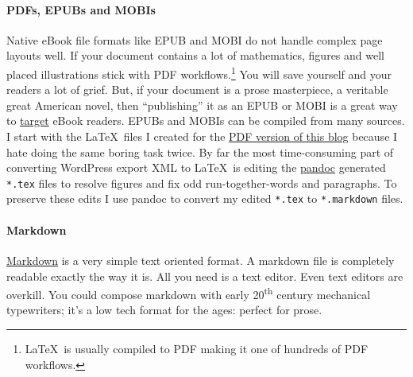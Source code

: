 \paragraph{PDFs, EPUBs and MOBIs}

Native eBook file formats like EPUB and MOBI do not handle complex page
layouts well. If your document contains a lot of mathematics, figures
and well placed illustrations stick with PDF
workflows.\footnote{
\LaTeX\ is usually compiled to PDF making it one
of hundreds of PDF workflows.
} You will save yourself and your readers a
lot of grief. But, if your document is a prose masterpiece, a veritable
great American novel, then ``publishing'' it as an EPUB or MOBI is a great way
to
\href{http://www.counterpunch.org/2011/01/20/in-praise-of-incivility-in-politics/}{target}
eBook readers. EPUBs and MOBIs can be compiled from many sources. I
start with the \LaTeX\ files I created for the
\href{https://github.com/bakerjd99/Analyze-the-Data-not-the-Drivel/blob/master/wp2latex/bm.pdf}{PDF version of this
blog} because I hate doing the same boring task twice. By far the most
time-consuming part of converting WordPress export XML to \LaTeX\ is
editing the \href{http://johnmacfarlane.net/pandoc/}{pandoc} generated
\texttt{*.tex} files to resolve figures and fix odd run-together-words
and paragraphs. To preserve these edits I use pandoc to convert my
edited \texttt{*.tex} to \texttt{*.markdown} files.

\paragraph{Markdown}

\href{http://daringfireball.net/projects/markdown/}{Markdown} is a very
simple text oriented format. A markdown file is completely readable
exactly the way it is. All you need is a text editor. Even text editors
are overkill. You could compose markdown with early 20\textsuperscript{th} century
mechanical typewriters; it's a low tech format for the ages: perfect for
prose.

